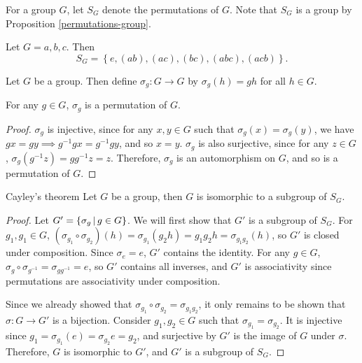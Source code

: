 \begin{defn}
    For a group $G$, let $S_G$ denote the permutations of $G$. Note that $S_G$ is a group by Proposition \ref{permutations-group}.
\end{defn}

\begin{exmp}
    Let $G = {a, b, c}$. Then \[S_G = \left\{e, (ab), (ac), (bc), (abc), (acb)\right\}.\]
\end{exmp}

\begin{defn}
    Let $G$ be a group. Then define $\sigma_g: G \to G$ by $\sigma_g(h) = gh$ for all $h \in G$.
\end{defn}

\begin{lemma}
    For any $g \in G$, $\sigma_g$ is a permutation of $G$.
\end{lemma}

\begin{proof}
    $\sigma_g$ is injective, since for any $x, y \in G$ such that $\sigma_g(x) = \sigma_g(y)$, we have $gx = gy \implies g^{-1}gx = g^{-1}gy$, and so $x = y$. $\sigma_g$ is also surjective, since for any $z \in G$, $\sigma_g(g^{-1}z) = gg^{-1}z = z$. Therefore, $\sigma_g$ is an automorphism on $G$, and so is a permutation of $G$.
\end{proof}

\begin{thm}Cayley's theorem\label{cayleys}\proofbreak
    Let $G$ be a group, then $G$ is isomorphic to a subgroup of $S_G$.
\end{thm}

\begin{proof}
    Let $G' = \left\{\sigma_g \,\middle|\, g \in G\right\}$. We will first show that $G'$ is a subgroup of $S_G$. For $g_1, g_1 \in G$, $(\sigma_{g_1} \circ \sigma_{g_2})(h) = \sigma_{g_1}(g_2h) = g_1g_2h = \sigma_{g_1g_2}(h)$, so $G'$ is closed under composition. Since $\sigma_e = e$, $G'$ contains the identity. For any $g \in G$, $\sigma_g \circ \sigma_{g^{-1}} = \sigma_{gg^{-1}} = e$, so $G'$ contains all inverses, and $G'$ is associativity since permutations are associativity under composition.

    Since we already showed that $\sigma_{g_1} \circ \sigma_{g_2} = \sigma_{g_1g_2}$, it only remains to be shown that $\sigma: G \to G'$ is a bijection. Consider $g_1, g_2 \in G$ such that $\sigma_{g_1} = \sigma_{g_2}$. It is injective since $g_1 = \sigma_{g_1}(e) = \sigma_{g_2}e = g_2$, and surjective by $G'$ is the image of $G$ under $\sigma$. Therefore, $G$ is isomorphic to $G'$, and $G'$ is a subgroup of $S_G$.
\end{proof}

